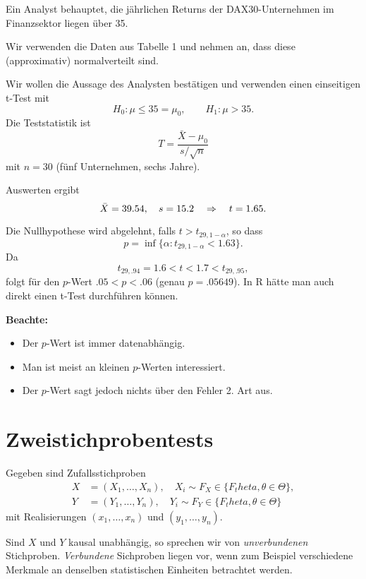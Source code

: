 \begin{exmp}
  Ein Analyst behauptet, die jährlichen Returns der DAX30-Unternehmen im
  Finanzsektor liegen über 35.

  Wir verwenden die Daten aus Tabelle 1 und nehmen an, dass diese (approximativ)
  normalverteilt sind.

  Wir wollen die Aussage des Analysten bestätigen und verwenden einen
  einseitigen t-Test mit
  \[ H_0 : \mu \le 35 = \mu_0, \qquad H_1 : \mu > 35. \]
  Die Teststatistik ist
  \[ T = \frac{\bar{X}-\mu_0}{s / \sqrt{n}} \]
  mit $n = 30$ (fünf Unternehmen, sechs Jahre).

  Auswerten ergibt
  \[ \bar{X} = \num{39.54}, \quad s = \num{15.2} \quad \Rightarrow \quad t = \num{1.65}. \]

  Die Nullhypothese wird abgelehnt, falls $t > t_{29,1-\alpha}$, so dass
  \[ p = \inf \{ \alpha : t_{29, 1-\alpha} < \num{1.63} \}. \]
  Da
  \[ t_{29,\num{.94}} = \num{1.6} < t < \num{1.7} < t_{29,\num{.95}}, \]
  folgt für den $p$-Wert $\num{.05} < p < \num{.06}$ (genau $p = \num{.05649}$).
  In R hätte man auch direkt einen t-Test durchführen können.
\end{exmp}

\textbf{Beachte:}
\begin{itemize}
\item Der $p$-Wert ist immer datenabhängig.
\item Man ist meist an kleinen $p$-Werten interessiert.
\item Der $p$-Wert sagt jedoch nichts über den Fehler 2. Art aus.
\end{itemize}

\section{Zweistichprobentests}
Gegeben sind Zufallsstichproben
\begin{align*}
  X &= (X_1, \ldots, X_n),
      \quad X_i \sim F_X \in \{ F_theta, \theta \in \Theta \}, \\
  Y &= (Y_1, \ldots, Y_n),
      \quad Y_i \sim F_Y \in \{ F_theta, \theta \in \Theta \}
\end{align*}
mit Realisierungen $(x_1, \ldots, x_n)$ und $(y_1, \ldots, y_n)$.

Sind $X$ und $Y$ kausal unabhängig, so sprechen wir von \emph{unverbundenen}
Stichproben. \emph{Verbundene} Sichproben liegen vor, wenn zum Beispiel
verschiedene Merkmale an denselben statistischen Einheiten betrachtet werden.

